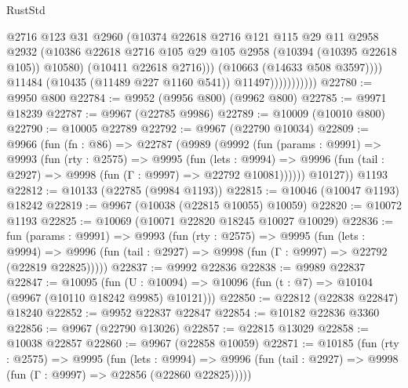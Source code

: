 \begin{lexlean}{RustStd}
\begin{coremodule}
                                @2716
                                @123
                                @31
                                @2960
                                (@10374
                                  @22618
                                  @2716
                                  @121
                                  @115
                                  @29
                                  @11
                                  @2958
                                  @2932
                                  (@10386
                                    @22618
                                    @2716
                                    @105
                                    @29
                                    @105
                                    @2958
                                    (@10394 (@10395 @22618 @105))
                                    @10580)
                                  (@10411 @22618 @2716)))
                              (@10663 (@14633 @508 @3597))))
                          @11484
                          (@10435 (@11489 @227 @1160 @541))
                          @11497)))))))))))
@22780 := @9950 @800
@22784 := @9952 (@9956 @800) (@9962 @800)
@22785 := @9971 @18239
@22787 := @9967 (@22785 @9986)
@22789 := @10009 (@10010 @800)
@22790 := @10005 @22789
@22792 := @9967 (@22790 @10034)
@22809 := @9966
    (fun (fn : @86) =>
    @22787
      (@9989
        (@9992
          (fun (params : @9991) =>
          @9993
            (fun (rty : @2575) =>
            @9995
              (fun (lets : @9994) =>
              @9996 (fun (tail : @2927) => @9998 (fun (Γ : @9997) => @22792 @10081))))))
        @10127))
    @1193
@22812 := @10133 (@22785 (@9984 @1193))
@22815 := @10046 (@10047 @1193) @18242
@22819 := @9967 (@10038 (@22815 @10055) @10059)
@22820 := @10072 @1193
@22825 := @10069 (@10071 @22820 @18245 @10027 @10029)
@22836 := fun (params : @9991) =>
  @9993
    (fun (rty : @2575) =>
    @9995
      (fun (lets : @9994) =>
      @9996 (fun (tail : @2927) => @9998 (fun (Γ : @9997) => @22792 (@22819 @22825)))))
@22837 := @9992 @22836
@22838 := @9989 @22837
@22847 := @10095
    (fun (U : @10094) => @10096 (fun (t : @7) => @10104 (@9967 (@10110 @18242 @9985) @10121)))
@22850 := @22812 (@22838 @22847) @18240
@22852 := @9952 @22837 @22847
@22854 := @10182 @22836 @3360
@22856 := @9967 (@22790 @13026)
@22857 := @22815 @13029
@22858 := @10038 @22857
@22860 := @9967 (@22858 @10059)
@22871 := @10185
    (fun (rty : @2575) =>
    @9995
      (fun (lets : @9994) =>
      @9996 (fun (tail : @2927) => @9998 (fun (Γ : @9997) => @22856 (@22860 @22825)))))

\end{coremodule}
\end{lexlean}
